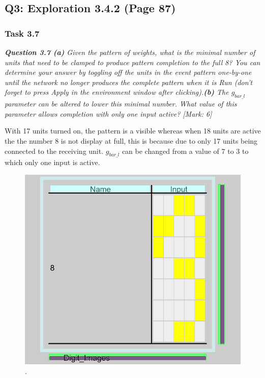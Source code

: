 \subsection{Q3: Exploration 3.4.2 (Page 87)}
\label{Q3:Expl 3.4.2 SubSection}

\subsubsection{Task 3.7}
\label{Q1:Expl 3.4.2 (3.7) SubSubSection}

\begin{tcolorbox}[colback=gray!20!white,colframe=gray!20!white]
  \emph{\textbf{Question 3.7 (a)} Given the pattern of weights, what is the minimal number of units that need to be clamped to produce pattern completion to the full 8? You can determine your answer by toggling off the units in the event pattern one-by-one until the network no longer produces the complete pattern when it is Run (don’t forget to press Apply in the environment window after clicking).\textbf{(b)} The $g_{bar\_l}$ parameter can be altered to lower this minimal number. What value of this parameter allows completion with only one input active? [Mark: 6]} 
\end{tcolorbox} 
\vspace{0.5cm}

With 17 units turned on, the pattern is a visible whereas when 18 units are active the the number 8 is not display at full, this is because due to only 17 units being connected to the receiving unit. $g_{bar\_l}$ can be changed from a value of 7 to 3 to which only one input is active.

\begin{figure}[H]
\centering
\includegraphics[scale=0.5]{Media/Main/EQ3/S0.png}
\caption{.}
\label{Q3.2}
\end{figure}

